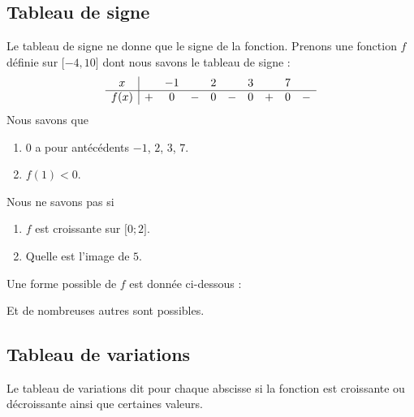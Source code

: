 \subsection{Tableau de signe}

Le tableau de signe ne donne que le signe de la fonction. Prenons une fonction \( f\) définie sur \( \mathopen[ -4 , 10 \mathclose]\) dont nous savons le tableau de signe :
\begin{equation*}
    \begin{array}[]{c|ccccccccc}
        x&&-1&&2&&3&&7&\\
        \hline
        f(x)&+&0&-&0&-&0&+&0&-\\
    \end{array}
\end{equation*}
Nous savons que
\begin{enumerate}
    \item
        \( 0\) a pour antécédents \( -1\), \( 2\), \( 3\), \( 7\).
    \item
        \( f(1)<0\).
\end{enumerate}
Nous ne savons pas si 
\begin{enumerate}
    \item
        \( f\) est croissante sur \( \mathopen[ 0 ; 2 \mathclose]\).
    \item
        Quelle est l'image de \( 5\).
\end{enumerate}

Une forme possible de \( f\) est donnée ci-dessous :
\begin{center}

\end{center}

Et de nombreuses autres sont possibles.

\subsection{Tableau de variations}

Le tableau de variations dit pour chaque abscisse si la fonction est croissante ou décroissante ainsi que certaines valeurs.


